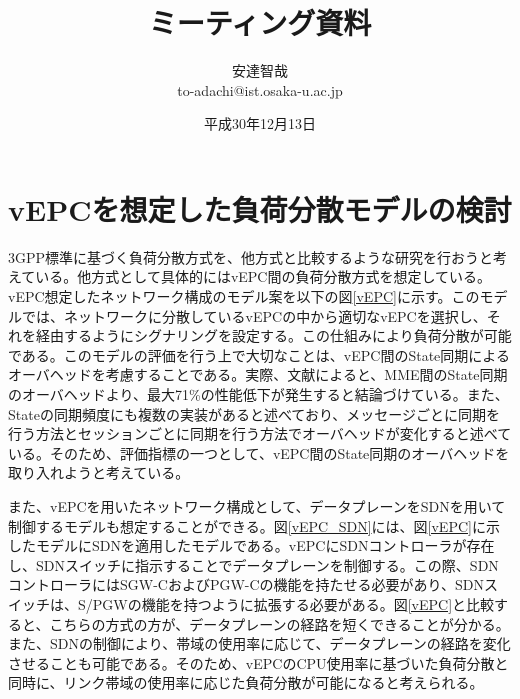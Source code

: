 \documentclass[a4j]{ujarticle}
\title{ミーティング資料}
\author{安達智哉\\to-adachi@ist.osaka-u.ac.jp}
\date{平成30年12月13日}
\begin{document}
\maketitle

\section{vEPCを想定した負荷分散モデルの検討}
3GPP標準に基づく負荷分散方式を、他方式と比較するような研究を行おうと考えている。他方式として具体的にはvEPC間の負荷分散方式を想定している。vEPC想定したネットワーク構成のモデル案を以下の図\ref{vEPC}に示す。このモデルでは、ネットワークに分散しているvEPCの中から適切なvEPCを選択し、それを経由するようにシグナリングを設定する。この仕組みにより負荷分散が可能である。このモデルの評価を行う上で大切なことは、vEPC間のState同期によるオーバヘッドを考慮することである。実際、文献\cite{PerformanceComparisonofStateSynchronizationTechniquesinaDistributedLTEEPC}によると、MME間のState同期のオーバヘッドより、最大71\%の性能低下が発生すると結論づけている。また、Stateの同期頻度にも複数の実装があると述べており、メッセージごとに同期を行う方法とセッションごとに同期を行う方法でオーバヘッドが変化すると述べている。そのため、評価指標の一つとして、vEPC間のState同期のオーバヘッドを取り入れようと考えている。


また、vEPCを用いたネットワーク構成として、データプレーンをSDNを用いて制御するモデルも想定することができる。図\ref{vEPC_SDN}には、図\ref{vEPC}に示したモデルにSDNを適用したモデルである。vEPCにSDNコントローラが存在し、SDNスイッチに指示することでデータプレーンを制御する。この際、SDNコントローラにはSGW-CおよびPGW-Cの機能を持たせる必要があり、SDNスイッチは、S/PGWの機能を持つように拡張する必要がある。図\ref{vEPC}と比較すると、こちらの方式の方が、データプレーンの経路を短くできることが分かる。また、SDNの制御により、帯域の使用率に応じて、データプレーンの経路を変化させることも可能である。そのため、vEPCのCPU使用率に基づいた負荷分散と同時に、リンク帯域の使用率に応じた負荷分散が可能になると考えられる。
\end{document}
